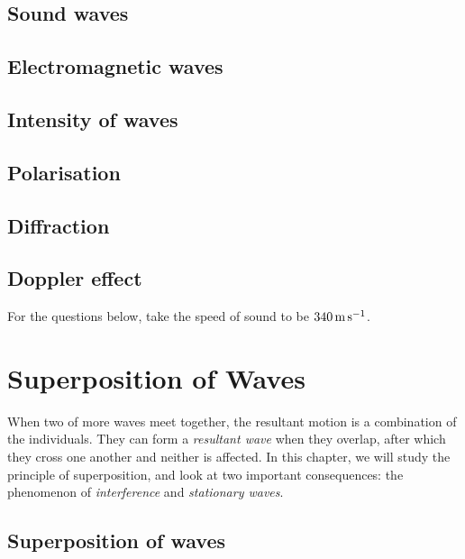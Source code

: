 \documentclass[a4paper,12pt]{book}
\newcounter{question}[chapter]
\renewcommand{\thequestion}{\arabic{chapter}.\arabic{question}}
\newcommand{\question}[1]{%
	\refstepcounter{question}
	\noindent{\textcolor{magenta}{\textsf{\textbf{Question \thequestion }}} \hspace*{1pt} #1 %
}}
\newcommand{\mps}{\,\text{m\,s}^{-1}}
\begin{document}
\subsection*{Sound waves}

\subsection*{Electromagnetic waves}


\subsection*{Intensity of waves}

\subsection*{Polarisation}

\subsection*{Diffraction}

\subsection*{Doppler effect}

For the questions below, take the speed of sound to be $340 \mps$.

\cleardoublepage

\section{Superposition of Waves}

When two of more waves meet together, the resultant motion is a combination of the individuals. They can form a \emph{resultant wave} when they overlap, after which they cross one another and neither is affected. In this chapter, we will study the principle of superposition, and look at two important consequences: the phenomenon of \emph{interference} and \emph{stationary waves}.

\subsection{Superposition of waves}
\end{document}
